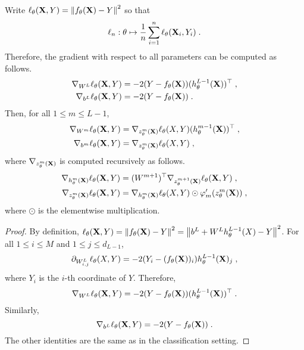 \begin{shaded}
\begin{proposition}
\label{prop:backpropagation:classif}
Write $\ell_{\theta}(\mathbf{X},Y) =  \left\|f_{\theta}(\mathbf{X}) - Y\right\|^2$ so that 
$$
\ell_n:\theta \mapsto \frac{1}{n} \sum_{i=1}^n \ell_{\theta}(\mathbf{X}_i,Y_i)\;. 
$$
Therefore, the gradient with respect to all parameters can be computed as follows.
\begin{align*}
\nabla_{W^L} \ell_{\theta}(\mathbf{X},Y) &= -2(Y - f_{\theta}(\mathbf{X}))(h^{L-1}_{\theta}(\mathbf{X}))^\top\;,\\
\nabla_{b^L} \ell_{\theta}(\mathbf{X},Y) &=-2(Y - f_{\theta}(\mathbf{X}))\;.
\end{align*}
Then, for all $1\leqslant m\leqslant L-1$,
\begin{align*}
\nabla_{W^m} \ell_{\theta}(\mathbf{X},Y) &= \nabla_{z_{\theta}^m(\mathbf{X})}\ell_{\theta}(X,Y)(h_{\theta}^{m-1}(\mathbf{X}))^\top\;,\\
\nabla_{b^m} \ell_{\theta}(\mathbf{X},Y) &=  \nabla_{z_{\theta}^m(\mathbf{X})}\ell_{\theta}(X,Y)\;,
\end{align*}
where $\nabla_{z_{\theta}^m(\mathbf{X})}$ is computed recursively as follows.
\begin{align*}
\nabla_{h_{\theta}^m(\mathbf{X})} \ell_{\theta}(\mathbf{X},Y) &= (W^{m+1})^\top\nabla_{z_{\theta}^{m+1}(\mathbf{X})} \ell_{\theta}(\mathbf{X},Y) \;,\\
\nabla_{z_{\theta}^m(\mathbf{X})} \ell_{\theta}(\mathbf{X},Y) &= \nabla_{h_{\theta}^m(\mathbf{X})}\ell_{\theta}(X,Y) \odot \varphi_m'(z_{\theta}^{m}(\mathbf{X}))\;,
\end{align*}
where $\odot$ is the elementwise multiplication.
\end{proposition}
\end{shaded}
\begin{proof}
By definition, $\ell_{\theta}(\mathbf{X},Y) =  \left\|f_{\theta}(\mathbf{X}) - Y\right\|^2 = \left\|b^L + W^Lh_{\theta}^{L-1}(X) - Y\right\|^2$.
For all $1\leqslant i\leqslant M$ and $1\leqslant j\leqslant d_{L-1}$,
$$
\partial_{W^L_{i,j}}\ell_{\theta}(X,Y) = -2(Y_i - (f_{\theta}(\mathbf{X}))_i)h^{L-1}_{\theta}(\mathbf{X})_j\;,
$$
where $Y_i$ is the $i$-th coordinate of $Y$. Therefore,
$$
\nabla_{W^L} \ell_{\theta}(\mathbf{X},Y) = -2(Y - f_{\theta}(\mathbf{X}))(h^{L-1}_{\theta}(\mathbf{X}))^\top\;.
$$
Similarly, 
$$
\nabla_{b^L} \ell_{\theta}(\mathbf{X},Y) =-2(Y - f_{\theta}(\mathbf{X}))\;.
$$
The other identities are the same as in the classification setting.
\end{proof}

